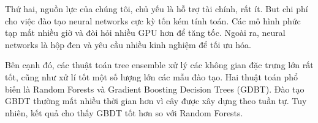 Thứ hai, nguồn lực của chúng tôi, chủ yếu là hỗ trợ tài chính, rất ít. But chi phí cho việc đào tạo neural networks cực kỳ tốn kém tính toán. Các mô hình phức tạp mất nhiều giờ và đòi hỏi nhiều GPU hơn để tăng tốc. Ngoài ra, neural networks là hộp đen và yêu cầu nhiều kinh nghiệm để tối ưu hóa.

Bên cạnh đó, các thuật toán tree ensemble xử lý các không gian đặc trưng lớn rất tốt, cũng như xử lí tốt một số lượng lớn các mẫu đào tạo. Hai thuật toán phổ biến là Random Forests và Gradient Boosting Decision Trees (GDBT). Đào tạo GBDT thường mất nhiều thời gian hơn vì cây được xây dựng theo tuần tự. Tuy nhiên, kết quả cho thấy GBDT tốt hơn so với Random Forests.
